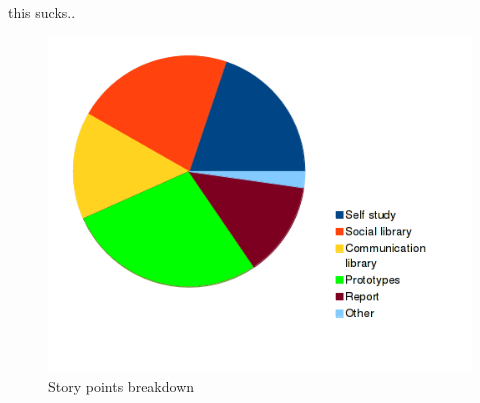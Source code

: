 \newpage

this sucks..

\begin{figure}[h!]
\centering \includegraphics[scale=0.8]{img/sprints-points.png}
\caption{Story points breakdown}
\label{fig:sprints-points}
\end{figure}